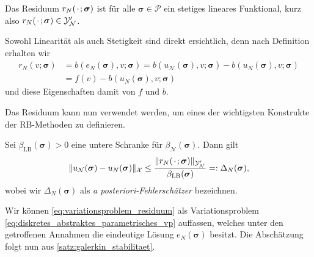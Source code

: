\documentclass[../main.tex]{subfiles}
\begin{document}
\begin{Lemma}\label{lemma:rbm_residuum_ist_funktional}
    Das Residuum $r_{N}({\mkern2mu\cdot\mkern2mu}; \bm \sigma)$ ist für alle $\bm \sigma \in \mathcal P$ ein stetiges lineares Funktional, kurz also $r_{N}({\mkern2mu\cdot\mkern2mu}; \bm \sigma) \in \mathcal Y_{\mathcal N}'$.

    \begin{Beweis}
        Sowohl Linearität als auch Stetigkeit sind direkt ersichtlich, denn nach Definition erhalten wir
        \begin{equation}\label{eq:residuum_durch_funktional_und_bilinearform}
            \begin{aligned}
            r_{N}(v; \bm \sigma)
            &= b(e_{N}(\bm \sigma), v; \bm \sigma)
            = b(u_{\mathcal N}(\bm \sigma), v; \bm \sigma) - b(u_{N}(\bm \sigma), v; \bm \sigma)
            \\&= f(v) - b(u_{N}(\bm \sigma), v; \bm \sigma)
            \end{aligned}
        \end{equation}
        und diese Eigenschaften damit von $f$ und $b$.
    \end{Beweis}
\end{Lemma}

Das Residuum kann nun verwendet werden, um eines der wichtigsten Konstrukte der RB-Methoden zu definieren.

\begin{Lemma}\label{lemma:rbm_fehler_schranke}
    Sei $\beta_{\mathrm{LB}}(\bm \sigma) > 0$ eine untere Schranke für $\beta_{\mathcal N}(\bm \sigma)$.
    Dann gilt
    \begin{equation}
        \lVert u_{\mathcal N}(\bm \sigma) - u_{N}(\bm \sigma)\rVert_{\mathcal X} \leq \frac{\lVert r_{N}({\mkern2mu\cdot\mkern2mu}; \bm \sigma)\rVert_{\mathcal Y_{\mathcal N}'}}{\beta_{\mathrm{LB}}(\bm \sigma)} =: \Delta_{N}(\bm \sigma),
    \end{equation}
    wobei wir $\Delta_{N}(\bm \sigma)$ als \emph{a posteriori-Fehlerschätzer} bezeichnen.

    \begin{Beweis}
        Wir können \cref{eq:variationsproblem_residuum} als Variationsproblem \cref{eq:diskretes_abstraktes_parametrisches_vp} auffassen, welches unter den getroffenen Annahmen die eindeutige Lösung $e_{N}(\bm \sigma)$ besitzt.
        Die Abschätzung folgt nun aus \cref{satz:galerkin_stabilitaet}.
    \end{Beweis}
\end{Lemma}
\end{document}
